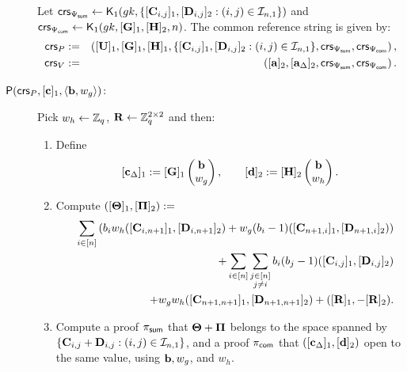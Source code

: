 \begin{description}
Let
$\mathsf{crs}_{\Psi_{\mathsf{sum}}} \gets \mathsf{K}_1({gk}, \{[\mathbf{{C}}_{i,j}]_1,[\mathbf{{D}}_{i,j}]_2:(i,j)\in\mathcal{I}_{n,1}\})$ and   
 $\mathsf{crs}_{\Psi_{\mathsf{com}}} \gets \mathsf{K}_1({gk}, [\mathbf{{G}}]_1,[{\mathbf{{H}}}]_2,n)$. The common reference string is given by:
\begin{eqnarray*}
\mathsf{crs}_P&:=&\left( [\mathbf{{U}}]_1,  [\mathbf{{G}}]_1,
    [\mathbf{{H}}]_1, \{[\mathbf{{C}}_{i,j}]_1,[\mathbf{{D}}_{i,j}]_2 :(i,j) \in \mathcal{I}_{n,1}\},\mathsf{crs}_{\Psi_{\mathsf{sum}}},\mathsf{crs}_{\Psi_{\mathsf{com}}} \right), \\
\mathsf{crs}_V&:=&\left([\mathbf{a}]_2, [\mathbf{a}_\Delta]_2, \mathsf{crs}_{\Psi_{\mathsf{sum}}},\mathsf{crs}_{\Psi_{\mathsf{com}}} \right). 
 \end{eqnarray*}
\item[{$\mathsf{P}(\mathsf{crs}_P, [\mathbf{c}]_1, \langle \mathbf{b}, w_g \rangle)$:}]
Pick $w_h \gets \mathbb{Z}_q$,  $\mathbf{{R}} \gets \mathbb{Z}_q^{2\times 2}$ and then: 
\begin{enumerate}
\item Define 
$$[\mathbf{c}_{\Delta}]_1 := [\mathbf{{G}}]_1 \begin{pmatrix} \mathbf{b} \\ w_g \end{pmatrix},
\qquad [\mathbf{d}]_2 := [{\mathbf{{H}}}]_2 \begin{pmatrix} \mathbf{b} \\ w_h \end{pmatrix}.$$ 
\item Compute 
 $([\mathbf{{\Theta}}]_1, [\mathbf{{\Pi}}]_2) :=$
\begin{eqnarray} \label{eq:ThetaPi}
& &
    \sum_{i \in [n]}\left(
        b_i w_h ([\mathbf{{C}}_{i,n+1}]_1,[\mathbf{{D}}_{i,n+1}]_2)+
        w_g(b_i-1) ([\mathbf{{C}}_{n+1,i}]_1, [\mathbf{{D}}_{n+1,i}]_2)\right)
        \nonumber\\ & &           +
       \sum_{i \in [n]}  \sum_{\substack{j \in [n]\\ j\neq i}} b_i (b_j-1) ([\mathbf{{C}}_{i,j}]_1, [\mathbf{{D}}_{i,j}]_2)\nonumber\\
       & &
     +
    w_gw_h ([\mathbf{{C}}_{n+1,n+1}]_1, [\mathbf{{D}}_{n+1,n+1}]_2) +  ([\mathbf{{R}}]_1,-[\mathbf{{R}}]_2).
 \end{eqnarray}

\item Compute a proof $\pi_{\mathsf{sum}}$
that $\mathbf{{\Theta}}+\mathbf{{\Pi}}$
belongs to the space spanned by $\{\mathbf{{C}}_{i,j}+\mathbf{{D}}_{i,j}:(i,j)\in\mathcal{I}_{n,1}\}$,
 and a proof 
$\pi_{\mathsf{com}}$
that
$([\mathbf{c}_\Delta]_1,[\mathbf{d}]_2)$ open to the same value,
using $\mathbf{b},w_g$, and $w_h$. 
\end{enumerate}


\end{description}

